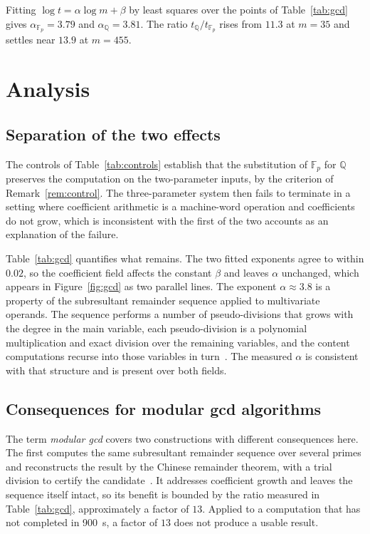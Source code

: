 \documentclass[11pt,a4paper]{article}
\theoremstyle{plain}
\theoremstyle{definition}
\theoremstyle{remark}
\newcommand{\FF}{\mathbb{F}}
\newcommand{\QQ}{\mathbb{Q}}
\begin{document}
Fitting $\log t = \alpha \log m + \beta$ by least squares over the points of Table~\ref{tab:gcd} gives
$\alpha_{\FF_p} = 3.79$ and $\alpha_{\QQ} = 3.81$. The ratio $t_{\QQ}/t_{\FF_p}$ rises from $11.3$ at
$m = 35$ and settles near $13.9$ at $m = 455$.

\section{Analysis}
\label{sec:analysis}

\subsection{Separation of the two effects}

The controls of Table~\ref{tab:controls} establish that the substitution of $\FF_p$ for $\QQ$
preserves the computation on the two-parameter inputs, by the criterion of Remark~\ref{rem:control}.
The three-parameter system then fails to terminate in a setting where coefficient arithmetic is a
machine-word operation and coefficients do not grow, which is inconsistent with the first of the two
accounts as an explanation of the failure.

Table~\ref{tab:gcd} quantifies what remains. The two fitted exponents agree to within $0.02$, so the
coefficient field affects the constant $\beta$ and leaves $\alpha$ unchanged, which appears in
Figure~\ref{fig:gcd} as two parallel lines. The exponent $\alpha \approx 3.8$ is a property of the
subresultant remainder sequence applied to multivariate operands. The sequence performs a number of
pseudo-divisions that grows with the degree in the main variable, each pseudo-division is a polynomial
multiplication and exact division over the remaining variables, and the content computations recurse
into those variables in turn~\cite{collins1967,brown1971}. The measured $\alpha$ is consistent with
that structure and is present over both fields.

\subsection{Consequences for modular gcd algorithms}

The term \emph{modular gcd} covers two constructions with different consequences here. The first
computes the same subresultant remainder sequence over several primes and reconstructs the result by
the Chinese remainder theorem, with a trial division to certify the candidate~\cite{brown1971}. It
addresses coefficient growth and leaves the sequence itself intact, so its benefit is bounded by the
ratio measured in Table~\ref{tab:gcd}, approximately a factor of $13$. Applied to a computation that
has not completed in \SI{900}{\second}, a factor of $13$ does not produce a usable result.
\end{document}
